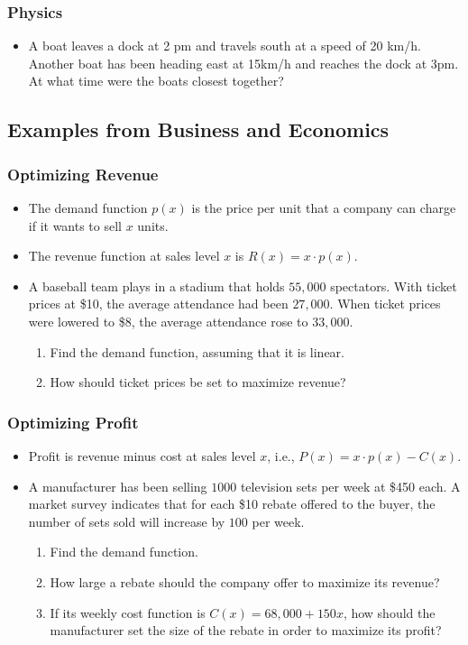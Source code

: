 \documentclass[serif,ignorenonframetext]{beamer}
\begin{document}
\begin{frame}
  \frametitle{Physics}
  \begin{itemize}[<+->]
  \item A boat leaves a dock at 2 pm and travels south at a speed of 
    20 km/h.  Another boat has been heading east at 15km/h and reaches
    the dock at 3pm.  At what time were the boats closest together?
  \end{itemize}
\end{frame}


\subsection{Examples from Business and Economics}

\begin{frame}
  \frametitle{Optimizing Revenue}
  \begin{itemize}[<+->]
  \item The demand function $p(x)$ is the price per unit that a company 
    can charge if it wants to sell $x$ units.
  \item The revenue function at sales level $x$ is $R(x)=x\cdot p(x)$.
  \item A baseball team plays in a stadium that holds $55,000$ spectators.
    With ticket prices at \$10, the average attendance had been $27,000$.
    When ticket prices were lowered to \$8, the average attendance rose
    to $33,000$.
    \begin{enumerate}[<+->]
    \item Find the demand function, assuming that it is linear.
    \item How should ticket prices be set to maximize revenue?
    \end{enumerate}
  \end{itemize}
\end{frame}

\begin{frame}
  \frametitle{Optimizing Profit}
  \begin{itemize}[<+->]
  \item Profit is revenue minus cost at sales level $x$, i.e.,
    $P(x)=x\cdot p(x) - C(x)$.
  \item A manufacturer has been selling $1000$ television sets per
    week at \$450 each.  A market survey indicates that for each \$10
    rebate offered to the buyer, the number of sets sold will increase
    by $100$ per week.
    \begin{enumerate}[<+->]
    \item Find the demand function.
    \item How large a rebate should the company offer to maximize its
      revenue?
    \item If its weekly cost function is $C(x)=68,000+150x$, how should
      the manufacturer set the size of the rebate in order to maximize
      its profit?
    \end{enumerate}
  \end{itemize}
\end{frame}
\end{document}
